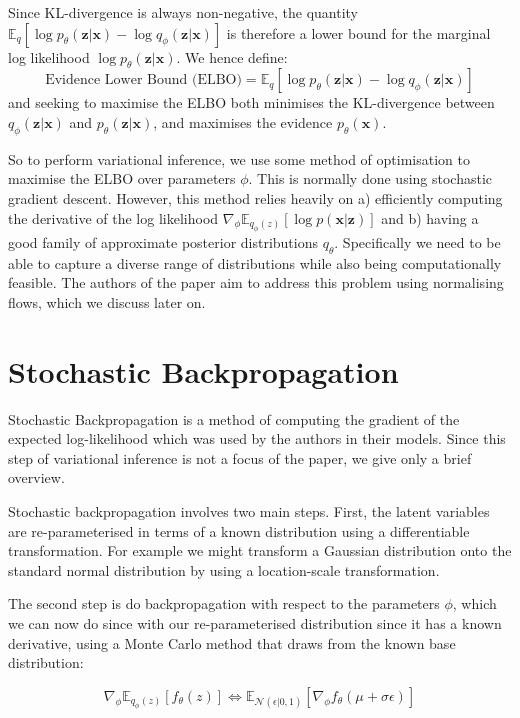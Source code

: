 Since KL-divergence is always non-negative, the quantity $ \mathbb{E}_q[\log p_\theta(\mathbf{z|x}) - \log q_\phi(\mathbf{z|x})] $ is therefore a lower bound for the marginal log likelihood $ \log p_\theta(\mathbf{z|x})$. We hence define:
 \begin{equation}
 	\text{Evidence Lower Bound (ELBO)} = \mathbb{E}_q[\log p_\theta(\mathbf{z|x}) - \log q_\phi(\mathbf{z|x})]
 \end{equation}  
 and seeking to maximise the ELBO both minimises the KL-divergence between $q_\phi(\mathbf{z|x})$ and $p_\theta(\mathbf{z|x})$, and maximises the evidence $p_\theta(\mathbf{x})$.

So to perform variational inference, we use some method of optimisation to maximise the ELBO over parameters $\phi$. This is normally done using stochastic gradient descent. However, this method relies heavily on a) efficiently computing the derivative of the log likelihood $ \nabla_\phi\mathbb{E}_{q_\phi(z)}[\log p(\mathbf{x|z})] $ and b) having a good family of approximate posterior distributions $q_\theta$. Specifically we need to be able to capture a diverse range of distributions while also being computationally feasible. The authors of the paper aim to address this problem using normalising flows, which we discuss later on.

\section{Stochastic Backpropagation}

Stochastic Backpropagation is a method of computing the gradient of the expected log-likelihood which was used by the authors in their models. Since this step of variational inference is not a focus of the paper, we give only a brief overview.

Stochastic backpropagation involves two main steps. First, the latent variables are re-parameterised in terms of a known distribution using a differentiable transformation. For example we might transform a Gaussian distribution onto the standard normal distribution by using a location-scale transformation. 

The second step is do backpropagation with respect to the parameters $\phi$, which we can now do since with our re-parameterised distribution since it has a known derivative, using a Monte Carlo method that draws from the known base distribution:

\begin{equation}
	\nabla_\phi\mathbb{E}_{q_\phi(z)}[f_\theta(z)] \Leftrightarrow \mathbb{E}_{\mathcal{N}(\epsilon |0,1)}[\nabla_\phi f_\theta(\mu + \sigma\epsilon)]
\end{equation}


